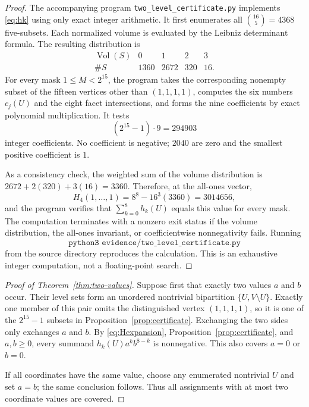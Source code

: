 \documentclass[11pt]{article}
\begin{document}
\begin{proof}
The accompanying program \texttt{two\_level\_certificate.py} implements
\eqref{eq:hk} using only exact integer arithmetic.  It first enumerates all
$\binom{16}{5}=4368$ five-subsets.  Each normalized volume is evaluated by
the Leibniz determinant formula.  The resulting distribution is
\[
\begin{array}{c|rrrr}
\operatorname{Vol}(S)&0&1&2&3\\ \hline
\#S&1360&2672&320&16.
\end{array}
\]
For every mask $1\leq M<2^{15}$, the program takes the corresponding
nonempty subset of the fifteen vertices other than $(1,1,1,1)$, computes the
six numbers $c_j(U)$ and the eight facet intersections, and forms the nine
coefficients by exact polynomial multiplication.  It tests
\[
 (2^{15}-1)\cdot9=294903
\]
integer coefficients.  No coefficient is negative; $2040$ are zero and the
smallest positive coefficient is $1$.

As a consistency check, the weighted sum of the volume distribution is
$2672+2(320)+3(16)=3360$.  Therefore, at the all-ones vector,
\[
 H_4(1,\ldots,1)=8^8-16^3(3360)=3014656,
\]
and the program verifies that $\sum_{k=0}^{8}h_k(U)$ equals this value for
every mask.  The computation terminates with a nonzero exit status if the
volume distribution, the all-ones invariant, or coefficientwise
nonnegativity fails.  Running
\[
 \texttt{python3 evidence/two\_level\_certificate.py}
\]
from the source directory reproduces the calculation.  This is an exhaustive
integer computation, not a floating-point search.
\end{proof}

\begin{proof}[Proof of Theorem~\ref{thm:two-values}]
Suppose first that exactly two values $a$ and $b$ occur.  Their level sets
form an unordered nontrivial bipartition $\{U,V\setminus U\}$.  Exactly one
member of this pair omits the distinguished vertex $(1,1,1,1)$, so it is one
of the $2^{15}-1$ subsets in Proposition~\ref{prop:certificate}.  Exchanging
the two sides only exchanges $a$ and $b$.  By \eqref{eq:Hexpansion},
Proposition~\ref{prop:certificate}, and $a,b\geq0$, every summand
$h_k(U)a^k b^{8-k}$ is nonnegative.  This also covers $a=0$ or $b=0$.

If all coordinates have the same value, choose any enumerated nontrivial
$U$ and set $a=b$; the same conclusion follows.  Thus all assignments with
at most two coordinate values are covered.
\end{proof}
\end{document}
